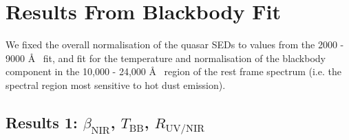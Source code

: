 \section{Results From Blackbody Fit}

We fixed the overall normalisation of the quasar SEDs to values from the 2000 - 9000 \AA~ fit, and fit for the temperature and normalisation of the blackbody component in the 10,000 - 24,000 \AA~ region of the rest frame spectrum (i.e. the spectral region most sensitive to hot dust emission). 

\subsection{Results 1: $\beta_{\mathrm{NIR}}$, $T_{\mathrm{BB}}$, $R_{\mathrm{UV}/\mathrm{NIR}}$}

